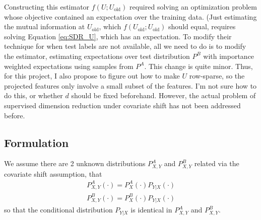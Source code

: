 \documentclass[8pt]{article}
\begin{document}
Constructing this
estimator $f(U;U_{\operatorname{old}})$ required solving an optimization problem whose objective
contained an expectation over the training data.  (Just estimating the
mutual information at $U_{\operatorname{old}}$, which
$f(U_{\operatorname{old}};U_{\operatorname{old}})$ should equal, requires solving Equation \ref{eq:SDR_U},
which has an expectation.  To modify their technique for when test
labels are not available, all we need to do is to modify the
estimator, estimating expectations over test distribution $P^B$ with
importance weighted expectations using samples from $P^A$.  This change
is quite minor.  Thus, for this project, I also propose to figure out
how to make $U$ row-sparse, so the projected features only involve a
small subset of the features.  I'm not sure how to do this, or whether
$d$ should be fixed beforehand.  However, the actual problem of
supervised dimension reduction under covariate shift has not been
addressed before.



\subsection{Formulation}
We assume there are 2 unknown distributions $P_{X,Y}^A$ and
$P_{X,Y}^B$ related via the covariate shift assumption, that
\begin{align}
P_{X,Y}^A(\cdot) = P_{X}^A(\cdot)P_{Y|X}(\cdot)\\
P_{X,Y}^B(\cdot) = P_{X}^B(\cdot)P_{Y|X}(\cdot)
\end{align}
so that the conditional distribution $P_{Y|X}$ is identical in $P_{X,Y}^A$ and
$P_{X,Y}^B$.
\end{document}
